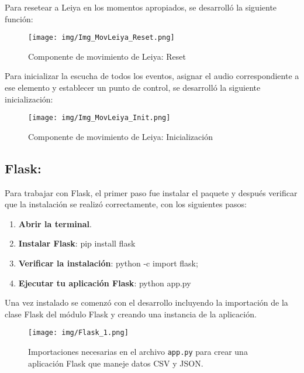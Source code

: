 \documentclass[a4paper, 12pt]{book}
\begin{document}
        Para resetear a Leiya en los momentos apropiados, se desarrolló la siguiente función:

        \begin{figure}[H]
            \centering
            \texttt{[image: img/Img\_MovLeiya\_Reset.png]}
            \caption{Componente de movimiento de Leiya: Reset}
            \label{fig:enter-label}
        \end{figure}


        Para inicializar la escucha de todos los eventos, asignar el audio correspondiente a ese elemento y establecer un punto de control, se desarrolló la siguiente inicialización:

        \begin{figure}[H]
            \centering
            \texttt{[image: img/Img\_MovLeiya\_Init.png]}
            \caption{Componente de movimiento de Leiya: Inicialización}
            \label{fig:enter-label}
        \end{figure}

        \subsection{Flask:} 

        Para trabajar con Flask, el primer paso fue instalar el paquete y después verificar que la instalación se realizó correctamente, con los siguientes pasos:      
        \begin{enumerate}
            \item \textbf{Abrir la terminal}.
            \item \textbf{Instalar Flask}: pip install flask
            \item \textbf{Verificar la instalación}: python -c import flask; 
            \item \textbf{Ejecutar tu aplicación Flask}: python app.py
        \end{enumerate}

        Una vez instalado se comenzó con el desarrollo incluyendo la importación de la clase Flask del módulo Flask y creando una instancia de la aplicación. 
        \begin{figure}[H]
            \centering
            \texttt{[image: img/Flask\_1.png]}
            \caption{\footnotesize Importaciones necesarias en el archivo \texttt{app.py} para crear una aplicación Flask que maneje datos CSV y JSON.}
            \label{fig:Flask_1}
        \end{figure}
\end{document}
